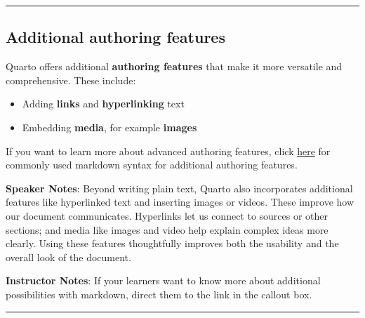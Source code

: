 \documentclass[
  letterpaper,
  DIV=11,
  numbers=noendperiod]{scrartcl}
\providecommand{\tightlist}{%
  \setlength{\itemsep}{0pt}\setlength{\parskip}{0pt}}
\begin{document}
\begin{center}\rule{0.5\linewidth}{0.5pt}\end{center}

\subsection{Additional authoring
features}\label{additional-authoring-features}

Quarto offers additional \textbf{authoring features} that make it more
versatile and comprehensive. These include:

\begin{itemize}
\tightlist
\item
  Adding \textbf{links} and \textbf{hyperlinking} text
\item
  Embedding \textbf{media}, for example \textbf{images}
\end{itemize}

\begin{tcolorbox}[enhanced jigsaw, opacitybacktitle=0.6, toptitle=1mm, colbacktitle=quarto-callout-note-color!10!white, toprule=.15mm, left=2mm, colback=white, colframe=quarto-callout-note-color-frame, opacityback=0, bottomtitle=1mm, breakable, titlerule=0mm, rightrule=.15mm, arc=.35mm, title=\textcolor{quarto-callout-note-color}{\faInfo}\hspace{0.5em}{Commonly used authoring features}, bottomrule=.15mm, coltitle=black, leftrule=.75mm]

If you want to learn more about advanced authoring features, click
\href{https://quarto.org/docs/authoring/markdown-basics.html}{here} for
commonly used markdown syntax for additional authoring features.

\end{tcolorbox}

\textbf{Speaker Notes}: Beyond writing plain text, Quarto also
incorporates additional features like hyperlinked text and inserting
images or videos. These improve how our document communicates.
Hyperlinks let us connect to sources or other sections; and media like
images and video help explain complex ideas more clearly. Using these
features thoughtfully improves both the usability and the overall look
of the document.

\textbf{Instructor Notes}: If your learners want to know more about
additional possibilities with markdown, direct them to the link in the
callout box.

\begin{center}\rule{0.5\linewidth}{0.5pt}\end{center}
\end{document}
